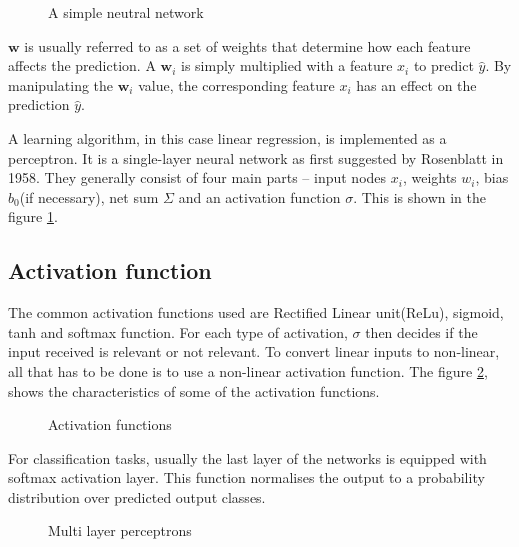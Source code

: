 \begin{figure}
    \centering
        \def\svgwidth{0.55\textwidth}
        
        \caption{A simple neutral network}
        \label{fig:simpleNN}
\end{figure}


$\mathbf{w}$ is usually referred to as a set of weights that determine how each feature
affects the prediction. A $\mathbf{w}_i$ is simply multiplied with a feature $x_i$ to
predict $\hat y$. By manipulating the $\mathbf{w}_i$ value, the corresponding feature $x_i$ has
an effect on the prediction  $\hat y$.

A learning algorithm, in this case linear regression, is implemented as a perceptron. It
is a single-layer neural network as first suggested by Rosenblatt in 1958. They generally consist of four main parts -- input
nodes $x_i$, weights $w_i$, bias $b_0$(if necessary), net sum $\Sigma$ and an activation
function $\sigma$. This is shown in the figure \ref{fig:simpleNN}.

\subsection{Activation function}
\label{subsec:activationfunction}
The common activation functions used are Rectified Linear unit(ReLu), sigmoid, tanh and
softmax function. For each type of activation, $\sigma$ then decides if the input received is
relevant or not relevant. To convert linear inputs to non-linear, all that has to be done
is to use a non-linear activation function. The figure \ref{fig:activationfunctions},
shows the characteristics of some of the activation functions.

\begin{figure}[!ht]
	\begin{center}
   \def\svgwidth{0.8\textwidth}
	\end{center}
    \caption{Activation functions}
    \label{fig:activationfunctions}
\end{figure}
For classification tasks, usually the last layer of the networks is equipped with softmax
activation layer. This function normalises the output to a probability distribution over
predicted output classes.

\begin{figure}[!ht]
    \def\svgwidth{0.8\textwidth}
	\begin{center}
    \end{center}
    \caption{Multi layer perceptrons}
    \label{fig:MLP}
\end{figure}

